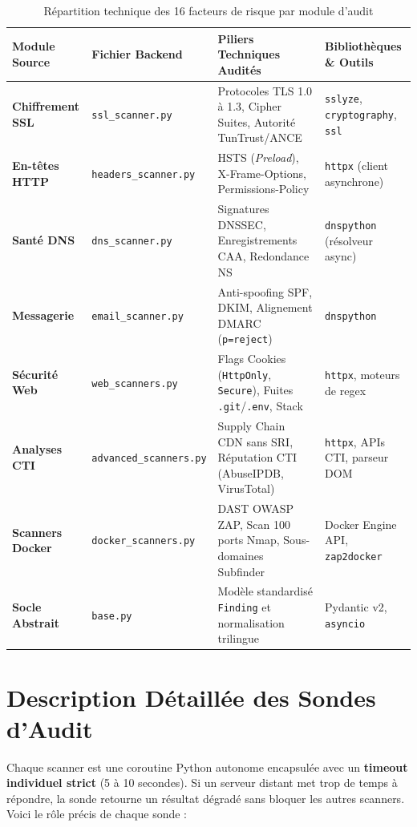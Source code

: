 \begin{table}[!htbp]
\centering
\caption{Répartition technique des 16 facteurs de risque par module d'audit}
\label{tab:scanners_modules}
\begin{singlespace}
\footnotesize
\renewcommand{\arraystretch}{1.08}
\begin{tabularx}{\textwidth}{p{2.6cm} l X p{3.6cm}}
\toprule
\textbf{Module Source} & \textbf{Fichier Backend} & \textbf{Piliers Techniques Audités} & \textbf{Bibliothèques \& Outils} \\
\midrule
\textbf{Chiffrement SSL} & \texttt{ssl\_scanner.py} & Protocoles TLS 1.0 à 1.3, Cipher Suites, Autorité TunTrust/ANCE & \texttt{sslyze}, \texttt{cryptography}, \texttt{ssl} \\
\textbf{En-têtes HTTP} & \texttt{headers\_scanner.py} & HSTS (\textit{Preload}), X-Frame-Options, Permissions-Policy & \texttt{httpx} (client asynchrone) \\
\textbf{Santé DNS} & \texttt{dns\_scanner.py} & Signatures DNSSEC, Enregistrements CAA, Redondance NS & \texttt{dnspython} (résolveur async) \\
\textbf{Messagerie} & \texttt{email\_scanner.py} & Anti-spoofing SPF, DKIM, Alignement DMARC (\texttt{p=reject}) & \texttt{dnspython} \\
\textbf{Sécurité Web} & \texttt{web\_scanners.py} & Flags Cookies (\texttt{HttpOnly}, \texttt{Secure}), Fuites \texttt{.git}/\texttt{.env}, Stack & \texttt{httpx}, moteurs de regex \\
\textbf{Analyses CTI} & \texttt{advanced\_scanners.py} & Supply Chain CDN sans SRI, Réputation CTI (AbuseIPDB, VirusTotal) & \texttt{httpx}, APIs CTI, parseur DOM \\
\textbf{Scanners Docker} & \texttt{docker\_scanners.py} & DAST OWASP ZAP, Scan 100 ports Nmap, Sous-domaines Subfinder & Docker Engine API, \texttt{zap2docker} \\
\textbf{Socle Abstrait} & \texttt{base.py} & Modèle standardisé \texttt{Finding} et normalisation trilingue & Pydantic v2, \texttt{asyncio} \\
\bottomrule
\end{tabularx}
\end{singlespace}
\end{table}

\section{Description Détaillée des Sondes d'Audit}
Chaque scanner est une coroutine Python autonome encapsulée avec un \textbf{timeout individuel strict} (5 à 10 secondes). Si un serveur distant met trop de temps à répondre, la sonde retourne un résultat dégradé sans bloquer les autres scanners. Voici le rôle précis de chaque sonde :

